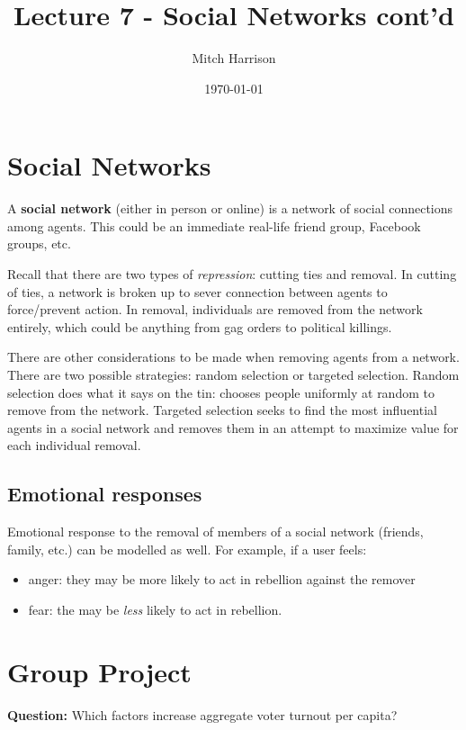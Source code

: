 \documentclass[titlepage, 12pt, leqno]{article}
\title{\Huge{Lecture 7 - Social Networks cont'd}}
\author{\large{Mitch Harrison}}
\date{\today}
\begin{document}
\setlength{\parskip}{1\baselineskip}
\setlength{\parindent}{15pt}
\maketitle
\tableofcontents
\newpage


\section{Social Networks}

\begin{definition}
    A \textbf{social network} (either in person or online) is a network of social
    connections among agents. This could be an immediate real-life friend
    group, Facebook groups, etc.
\end{definition}

Recall that there are two types of \textit{repression}: cutting ties and removal.
In cutting of ties, a network is broken up to sever connection between agents to
force/prevent action. In removal, individuals are removed from the network 
entirely, which could be anything from gag orders to political killings.

There are other considerations to be made when removing agents from a network.
There are two possible strategies: random selection or targeted selection. Random
selection does what it says on the tin: chooses people uniformly at random to
remove from the network. Targeted selection seeks to find the most influential
agents in a social network and removes them in an attempt to maximize value for
each individual removal.

\subsection{Emotional responses}
Emotional response to the removal of members of a social network (friends, family,
etc.) can be modelled as well. For example, if a user feels:
\begin{itemize}
    \item anger: they may be more likely to act in rebellion against the remover
    \item fear: the may be \textit{less} likely to act in rebellion.
\end{itemize}

\pagebreak
\section{Group Project}
\textbf{Question:} Which factors increase aggregate voter turnout per capita?
\end{document}
